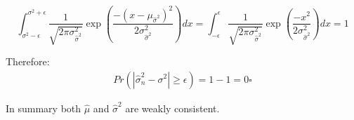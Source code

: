 \begin{solution}
\begin{equation}
\int_{\sigma^2-\epsilon}^{\sigma^2+\epsilon}\frac{1}{\sqrt{2\pi\sigma^2_{\hat{\sigma}^2}}}\exp\left(\frac{-(x - \mu_{\hat{\sigma}^2})^2}{2\sigma^2_{\hat{\sigma}^2}}\right)dx
= \int_{-\epsilon}^{\epsilon}\frac{1}{\sqrt{2\pi\sigma^2_{\hat{\sigma}^2}}}\exp\left(\frac{-x^2}{2\sigma^2_{\hat{\sigma}^2}}\right)dx = 1
\end{equation}

Therefore: 
\begin{equation}
\begin{split}
Pr(|\hat{\sigma}^2_n - \sigma^2| \geq \epsilon) = 1 - 1 = 0 \square 
\end{split}
\end{equation}

\end{solution}

In summary both $\hat{\mu}$ and $\hat{\sigma}^2$ are weakly consistent.